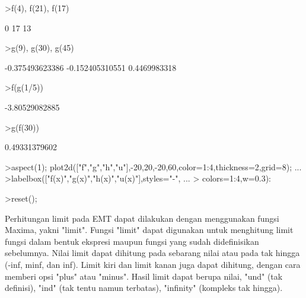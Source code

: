 \documentclass{article}
\begin{document}
\begin{eulernotebook}
\begin{euleroutput}
\end{euleroutput}
\begin{eulerprompt}
>f(4), f(21), f(17)
\end{eulerprompt}
\begin{euleroutput}
  0
  17
  13
\end{euleroutput}
\begin{eulerprompt}
>g(9), g(30), g(45)
\end{eulerprompt}
\begin{euleroutput}
  -0.375493623386
  -0.152405310551
  0.4469983318
\end{euleroutput}
\begin{eulerprompt}
>f(g(1/5))
\end{eulerprompt}
\begin{euleroutput}
  -3.80529082885
\end{euleroutput}
\begin{eulerprompt}
>g(f(30))
\end{eulerprompt}
\begin{euleroutput}
  0.49331379602
\end{euleroutput}
\begin{eulerprompt}
>aspect(1); plot2d(["f","g","h","u"],-20,20,-20,60,color=1:4,thickness=2,grid=8); ...
>labelbox(["f(x)","g(x)","h(x)","u(x)"],styles="-", ...
>   colors=1:4,w=0.3):
\end{eulerprompt}
\begin{eulerprompt}
>reset();
\end{eulerprompt}
\begin{eulercomment}
\begin{eulercomment}
\begin{eulercomment}
Perhitungan limit pada EMT dapat dilakukan dengan menggunakan fungsi
Maxima, yakni "limit". Fungsi "limit" dapat digunakan untuk menghitung
limit fungsi dalam bentuk ekspresi maupun fungsi yang sudah
didefinisikan sebelumnya. Nilai limit dapat dihitung pada sebarang
nilai atau pada tak hingga (-inf, minf, dan inf). Limit kiri dan limit
kanan juga dapat dihitung, dengan cara memberi opsi "plus" atau
"minus". Hasil limit dapat berupa nilai, "und" (tak definisi), "ind"
(tak tentu namun terbatas), "infinity" (kompleks tak hingga).


\end{eulercomment}
\end{eulercomment}
\end{eulercomment}
\end{eulernotebook}
\end{document}
